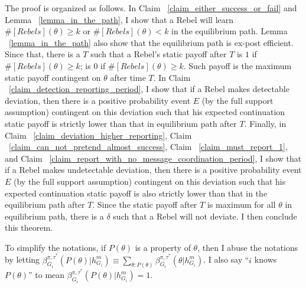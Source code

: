 \documentclass[12pt,letter]{article}
\theoremstyle{definition}
\theoremstyle{remark}
\theoremstyle{claim}
\begin{document}
The proof is organized as follows. In Claim ~\ref{claim_either_success_or_fail} and Lemma ~\ref{lemma_in_the_path}, I show that a Rebel will learn $\#[Rebels](\theta)\geq k$ or $\#[Rebels](\theta)< k$ in the equilibrium path. Lemma ~\ref{lemma_in_the_path} also show that the equilibrium path is ex-post efficient. Since that, there is a $T$ such that a Rebel's static payoff after $T$ is $1$ if $\#[Rebels](\theta)\geq k$; is $0$ if $\#[Rebels](\theta)\geq k$. Such payoff is the maximum static payoff contingent on $\theta$ after time $T$. In Claim ~\ref{claim_detection_reporting_period}, I show that if a Rebel makes detectable deviation, then there is a positive probability event $E$ (by the full support assumption) contingent on this deviation such that his expected continuation static payoff is strictly lower than that in equilibrium path after $T$. Finally, in Claim ~\ref{claim_deviation_higher_reporting}, Claim ~\ref{claim_can_not_pretend_almost_success}, Claim ~\ref{claim_must_report_1}, and Claim ~\ref{claim_report_with_no_message_coordination_period}, I show that if a Rebel makes undetectable deviation, then there is a positive probability event $E$ (by the full support assumption) contingent on this deviation such that his expected continuation static payoff is also strictly lower than that in the equilibrium path after $T$. Since the static payoff after $T$ is maximum for all $\theta$ in equilibrium path, there is a $\delta$ such that a Rebel will not deviate. I then conclude this theorem.

To simplify the notations, if $P(\theta)$ is a property of $\theta$, then I abuse the notations by letting $\beta^{\pi,\tau^*}_{G_i}(P(\theta)|h^{m}_{G_i})\equiv \sum_{\theta:P(\theta)}\beta^{\pi,\tau^*}_{G_i}(\theta|h^{m}_{G_i})$. I also say ``$i$ knows $P(\theta)$'' to mean $\beta^{\pi,\tau^*}_{G_i}(P(\theta)|h^{m}_{G_i})=1$. 
\end{document}
